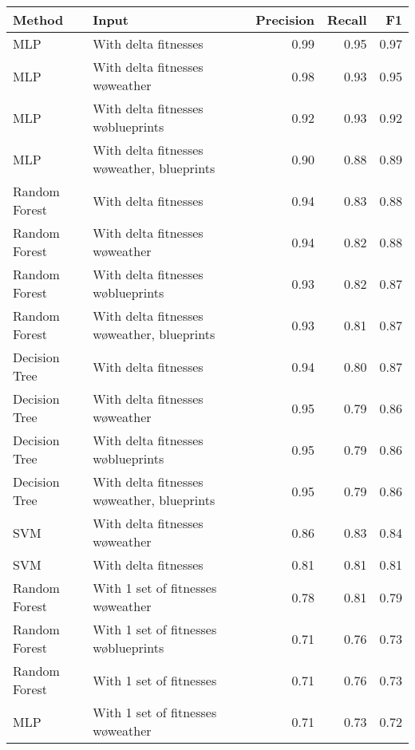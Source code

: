 \begin{tabular}{llrrr}
\toprule
        Method &                                           Input &  Precision &  Recall &   F1 \\
\midrule
           MLP &                            With delta fitnesses &       0.99 &    0.95 & 0.97 \\
           MLP &                With delta fitnesses w\o weather &       0.98 &    0.93 & 0.95 \\
           MLP &             With delta fitnesses w\o blueprints &       0.92 &    0.93 & 0.92 \\
           MLP &    With delta fitnesses w\o weather, blueprints &       0.90 &    0.88 & 0.89 \\
 Random Forest &                            With delta fitnesses &       0.94 &    0.83 & 0.88 \\
 Random Forest &                With delta fitnesses w\o weather &       0.94 &    0.82 & 0.88 \\
 Random Forest &             With delta fitnesses w\o blueprints &       0.93 &    0.82 & 0.87 \\
 Random Forest &    With delta fitnesses w\o weather, blueprints &       0.93 &    0.81 & 0.87 \\
 Decision Tree &                            With delta fitnesses &       0.94 &    0.80 & 0.87 \\
 Decision Tree &                With delta fitnesses w\o weather &       0.95 &    0.79 & 0.86 \\
 Decision Tree &             With delta fitnesses w\o blueprints &       0.95 &    0.79 & 0.86 \\
 Decision Tree &    With delta fitnesses w\o weather, blueprints &       0.95 &    0.79 & 0.86 \\
           SVM &                With delta fitnesses w\o weather &       0.86 &    0.83 & 0.84 \\
           SVM &                            With delta fitnesses &       0.81 &    0.81 & 0.81 \\
 Random Forest &             With 1 set of fitnesses w\o weather &       0.78 &    0.81 & 0.79 \\
 Random Forest &          With 1 set of fitnesses w\o blueprints &       0.71 &    0.76 & 0.73 \\
 Random Forest &                         With 1 set of fitnesses &       0.71 &    0.76 & 0.73 \\
           MLP &             With 1 set of fitnesses w\o weather &       0.71 &    0.73 & 0.72 \\

\end{tabular}

